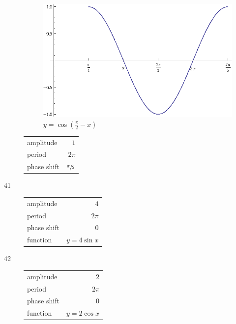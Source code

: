\documentclass{exam}
\begin{document}
\begin{description}
        \begin{figure}[H]
          \centering
          \includegraphics[scale=1.0]{exercise40.eps}
          $y = \cos \left( \frac{\pi}{2} - x \right) $
        \end{figure}

        \begin{tabular}[H]{lr}
          \toprule
          amplitude   & $1$ \\
          period      & $2 \pi$ \\
          phase shift & $\sfrac{\pi}{2}$ \\
          \bottomrule
        \end{tabular}

    \item[41]
      \begin{tabular}[H]{lr}
        \toprule
        amplitude   & $4$ \\
        period      & $2 \pi$ \\
        phase shift & $0$ \\
        function    & $y = 4 \sin x$ \\
        \bottomrule
      \end{tabular}

    \item[42]
      \begin{tabular}[H]{lr}
        \toprule
        amplitude   & $2$ \\
        period      & $2 \pi$ \\
        phase shift & $0$ \\
        function    & $y = 2 \cos x$ \\
        \bottomrule
      \end{tabular}


\end{description}
\end{document}
